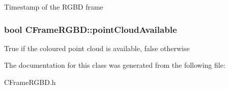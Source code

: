 \label{class_c_frame_r_g_b_d_a0f7c2fb4831a936c63b78305ab9298bd}
Timestamp of the RGBD frame \hypertarget{class_c_frame_r_g_b_d_ace30426f416cd66b2a0a256071d93464}{
\subsubsection[{pointCloudAvailable}]{\setlength{\rightskip}{0pt plus 5cm}bool {\bf CFrameRGBD::pointCloudAvailable}}}
\label{class_c_frame_r_g_b_d_ace30426f416cd66b2a0a256071d93464}
True if the coloured point cloud is available, false otherwise 

The documentation for this class was generated from the following file:\begin{DoxyCompactItemize}
\item 
CFrameRGBD.h\end{DoxyCompactItemize}
